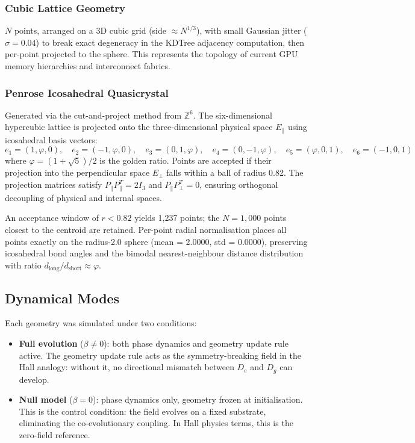 \documentclass[11pt,a4paper]{article}
\begin{document}
\subsubsection{Cubic Lattice Geometry}

$N$ points, arranged on a 3D cubic grid (side $\approx N^{1/3}$), with small Gaussian jitter ($\sigma = 0.04$) to break exact degeneracy in the KDTree adjacency computation, then per-point projected to the sphere. This represents the topology of current GPU memory hierarchies and interconnect fabrics.

\subsubsection{Penrose Icosahedral Quasicrystal}

Generated via the cut-and-project method from $\mathbb{Z}^6$. The six-dimensional hypercubic lattice is projected onto the three-dimensional physical space $E_{\parallel}$ using icosahedral basis vectors:
\begin{equation}
e_1 = (1, \varphi, 0), \quad e_2 = (-1, \varphi, 0), \quad e_3 = (0, 1, \varphi), \quad e_4 = (0, -1, \varphi), \quad e_5 = (\varphi, 0, 1), \quad e_6 = (-1, 0, 1)
\end{equation}
where $\varphi = (1+\sqrt{5})/2$ is the golden ratio. Points are accepted if their projection into the perpendicular space $E_{\perp}$ falls within a ball of radius 0.82. The projection matrices satisfy $P_{\parallel} P_{\parallel}^T = 2I_3$ and $P_{\parallel} P_{\perp}^T = 0$, ensuring orthogonal decoupling of physical and internal spaces.

An acceptance window of $r < 0.82$ yields 1,237 points; the $N = 1{,}000$ points closest to the centroid are retained. Per-point radial normalisation places all points exactly on the radius-2.0 sphere (mean = 2.0000, std = 0.0000), preserving icosahedral bond angles and the bimodal nearest-neighbour distance distribution with ratio $d_{\text{long}}/d_{\text{short}} \approx \varphi$.

\subsection{Dynamical Modes}

Each geometry was simulated under two conditions:

\begin{itemize}
\item \textbf{Full evolution} ($\beta \neq 0$): both phase dynamics and geometry update rule active. The geometry update rule acts as the symmetry-breaking field in the Hall analogy: without it, no directional mismatch between $D_e$ and $D_g$ can develop.

\item \textbf{Null model} ($\beta = 0$): phase dynamics only, geometry frozen at initialisation. This is the control condition: the field evolves on a fixed substrate, eliminating the co-evolutionary coupling. In Hall physics terms, this is the zero-field reference.
\end{itemize}
\end{document}
